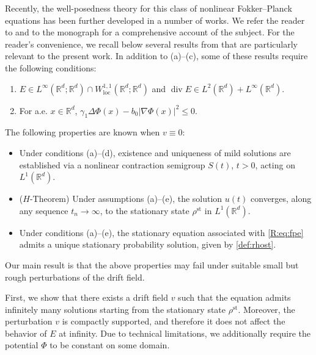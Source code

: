 \documentclass[10pt,a4paper]{amsart}
\numberwithin{equation}{section}
\def\leq{\leqslant}
\def\leq{\leqslant}
\begin{document}
Recently, the well-posedness theory for this class of nonlinear
Fokker--Planck equations has been further developed in a number of works. We
refer the reader to \cite{BR21,BR22,BR23,BR23b,Gru25} and to the monograph
\cite{BKRS22} for a comprehensive account of the subject. For the reader's
convenience, we recall below several results from \cite{BR23} that are
particularly relevant to the present work. In addition to
\textnormal{(a)}--\textnormal{(c)}, some of these results require the following
conditions:
\begin{enumerate}
    \item[(d)] $E\in L^\infty(\mathbb{R}^d;\mathbb{R}^d)
    \cap W^{1,1}_{\mathrm{loc}}(\mathbb{R}^d;\mathbb{R}^d)$ and
    $ 
    \operatorname{div}E
    \in    L^2(\mathbb{R}^d)+L^\infty(\mathbb{R}^d).
   $ 

    \item[(e)] For a.e. $x\in\mathbb{R}^d$, $
    \gamma_1\Delta\Phi(x)-b_0|\nabla\Phi(x)|^2
    \leq 0 .$ 
\end{enumerate}
The following properties are known when $v\equiv0$:
\begin{itemize}
    \item Under conditions \textnormal{(a)}--\textnormal{(d)}, existence and
    uniqueness of mild solutions are established via a nonlinear contraction
    semigroup $S(t)$, $t>0$, acting on $L^1(\mathbb{R}^d)$.

    \item \textnormal{($H$-Theorem)} Under assumptions
    \textnormal{(a)}--\textnormal{(e)},  the solution $u(t)$ converges, along
    any sequence $t_n\to\infty$, to the stationary state $\rho^{\mathrm{st}}$ in
    $L^1(\mathbb{R}^d)$.

    \item Under conditions \textnormal{(a)}--\textnormal{(e)}, the stationary
    equation associated with \eqref{R:eq:fpe} admits a unique stationary
    probability solution, given by \eqref{def:rhost}.
\end{itemize}

Our main result is that the above properties may fail under suitable small but
rough perturbations of the drift field.

First, we show that there exists a drift field $v$ such that the equation
admits infinitely many solutions starting from the stationary state
$\rho^{\mathrm{st}}$. Moreover, the perturbation $v$ is compactly supported, and
therefore it does not affect the behavior of $E$ at infinity. Due to technical
limitations, we additionally require the potential $\Phi$ to be constant on some domain.
\end{document}
